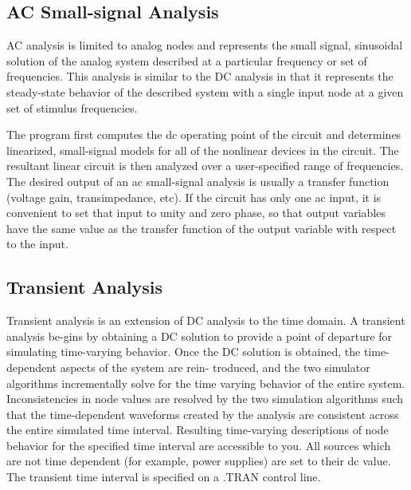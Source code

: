 \subsection{AC Small-signal Analysis}
AC analysis is limited to analog nodes and represents the small signal, sinusoidal solution of the analog system described at a particular frequency or set of frequencies. This analysis is similar to the DC analysis in that it represents the steady-state behavior of the described system with a single input node at a given set of stimulus frequencies. 

The program first computes the dc operating point of the circuit and determines linearized, small-signal models for all of the nonlinear devices in the circuit. The resultant linear circuit is then analyzed over a user-specified range of frequencies. The desired output of an ac small-signal analysis is usually a transfer function (voltage gain, transimpedance, etc). If the circuit has only one ac input, it is convenient to set that input to unity and zero phase, so that output variables have the same value as the transfer function of the output variable with respect to the input.
\subsection{Transient Analysis}
Transient analysis is an extension of DC analysis to the time domain. A transient analysis be-gins by obtaining a DC solution to provide a point of departure for simulating time-varying behavior. Once the DC solution is obtained, the time-dependent aspects of the system are rein- troduced, and the two simulator algorithms incrementally solve for the time varying behavior of the entire system. Inconsistencies in node values are resolved by the two simulation algorithms such that the time-dependent waveforms created by the analysis are consistent across the entire simulated time interval. Resulting time-varying descriptions of node behavior for the specified time interval are accessible to you. All sources which are not time dependent (for example, power supplies) are set to their dc value. The transient time interval is specified on a .TRAN control line. 
